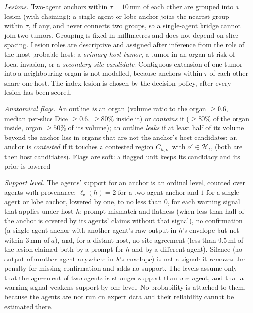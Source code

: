 \documentclass[fleqn,10pt]{olplainarticle}
\begin{document}
\emph{Lesions.} Two-agent anchors within $\tau=10$\,mm of each other are grouped into a lesion (with chaining); a single-agent
or lobe anchor joins the nearest group within $\tau$, if any, and never connects two groups, so a single-agent bridge cannot join
two tumors. Grouping is fixed in millimetres and does not depend on slice
spacing. Lesion roles are descriptive and assigned after inference from the role of the most probable host: a
\emph{primary-host tumor}, a tumor in an organ at risk of local invasion, or a \emph{secondary-site candidate}.
Contiguous extension of one tumor into a neighbouring organ is not modelled, because anchors within $\tau$ of each other
share one host. The index lesion is chosen by the
decision policy, after every lesion has been scored.

\emph{Anatomical flags.} An outline \emph{is} an organ (volume ratio to the organ $\ge0.6$, median per-slice Dice $\ge0.6$,
$\ge80\%$ inside it) or \emph{contains} it ($\ge80\%$ of the organ inside, organ $\ge50\%$ of its volume); an outline
\emph{leaks} if at least half of its volume beyond the anchor lies in organs that are not the anchor's host candidates;
an anchor is \emph{contested} if it touches a contested region $C_{h,o'}$ with $o'\in\mathcal{H}_C$ (both are then host
candidates). Flags are soft: a flagged unit keeps its candidacy and its prior is lowered.

\emph{Support level.} The agents' support for an anchor is an ordinal level, counted over agents with provenance:
$\ell_a(h)=2$ for a two-agent anchor and $1$ for a single-agent or lobe anchor, lowered by one, to no less than $0$, for
each warning signal that applies under host $h$: prompt mismatch and flatness (when less than half of the anchor is
covered by its agents' claims without that signal), no confirmation (a single-agent anchor with another agent's raw output
in $h$'s envelope but not within $3$\,mm of $a$), and, for a distant host, no site agreement (less than $0.5$\,ml of the
lesion claimed both by a prompt for $h$ and by a different agent). Silence (no output of another agent anywhere in $h$'s
envelope) is not a signal: it removes the penalty for missing confirmation and adds no support. The levels assume only
that the agreement of two agents is stronger support than one agent, and that a warning signal weakens support by one
level. No probability is attached to them, because the agents are not run on expert data and their reliability cannot be
estimated there.
\end{document}
